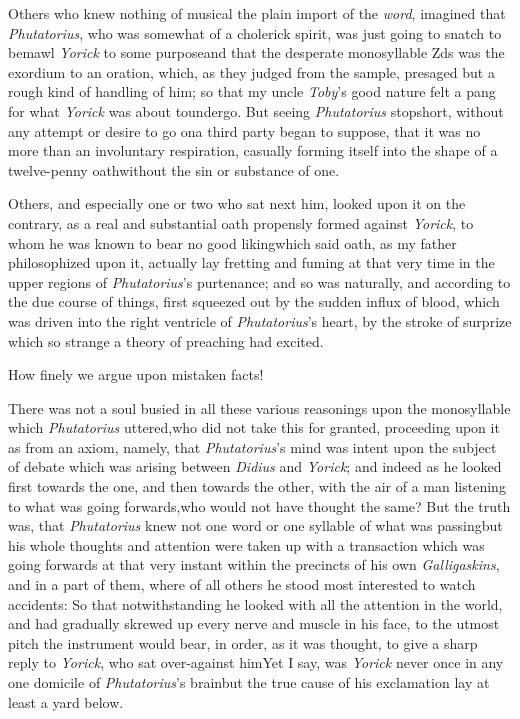 \documentclass{article}
\begin{document}
Others who knew nothing of musical\break 
{}
the plain import of the \textit{word}, imagined that
\textit{Phutatorius}, who was somewhat of a cholerick spirit, was
just going to snatch  to bemawl \textit{Yorick} to some purpose\tsk and
that the desperate monosyllable Z\tsh ds was the exordium
to an oration, which, as they judged from the sample, presaged but
a rough kind of handling of him;\break 
so that my uncle \textit{Toby}’s good nature felt\break
a pang for what \textit{Yorick} was about to\break undergo. But seeing
\textit{Phutatorius} stop\break short,
without any attempt or desire to go on\tsk a third party began to
suppose,
that it was no more than an involuntary respiration,
casually forming itself into the shape of a twelve-penny
oath\tsk without the sin or substance of one.

Others, and especially one or two who sat next him, looked
upon it on the contrary, as a real and substantial oath
pro\-pensly formed against \textit{Yorick}, to whom he was
known to bear no good liking\tsk\break which said oath, as my
father philosophized upon it, actually lay fretting and
fuming at that very time in the upper regions of
\textit{Phutatorius}’s purtenance; and so was naturally, and
according to the due course of things, first squeezed out by
the sudden influx of blood, which was driven into the right
ventricle of \textit{Phutatorius}’s heart, by the stroke of
surprize which so strange a theory of preaching had excited.

How finely we argue upon mistaken facts!

There was not a soul busied in all these various reasonings upon
the monosyllable which \textit{Phutatorius} uttered,\tsk who did not
take this for granted, proceeding upon it as from an axiom, namely,
that \textit{Phutatorius}’s mind was intent upon the subject of debate which was arising between
\textit{Didius} and \textit{Yorick}; and indeed as he looked first
towards the one, and then towards the other, with the air of a man
listening to what was going forwards,\tsk who would not have
thought the same? But the truth was, that \textit{Phutatorius} knew
not one word or one syllable of what was passing\tsk but his
whole thoughts and attention were taken up with a transaction which
was going forwards at that very instant within the precincts of his
own \textit{Galligaskins}, and in a part of them, where of all others
he stood most interested to watch accidents: So that
notwithstanding he looked with all the attention in the world, and
had gradually skrewed up every nerve and muscle in his face, to the
utmost pitch the instrument would bear, in order, as it was
thought, to give a sharp reply to \textit{Yorick}, who sat
over-against him\tsk Yet I say, was \textit{Yorick} never
once in any one domicile of \textit{Phutatorius}’s
brain\tsk but the true cause of his exclamation lay at
least a yard below.
\end{document}
